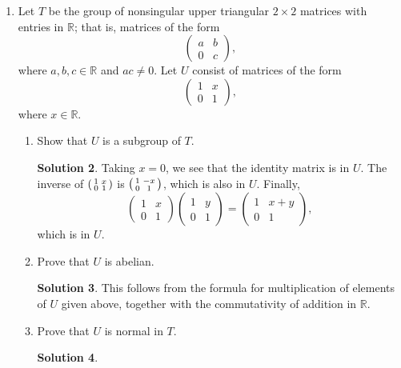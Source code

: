 \documentclass{article}
\newcommand{\RR}{\mathbb{R}}
\theoremstyle{definition}
\newtheorem*{solution}{Solution}
\begin{document}
\begin{enumerate}
\begin{solution}
\end{solution}
\item[10.4.] Let $T$ be the group of nonsingular upper triangular $2 \times 2$ matrices with entries in $\RR$; that is, matrices of the form
\[
\begin{pmatrix} a & b \\ 0 & c \end{pmatrix},
\]
where $a, b, c \in \RR$ and $ac \ne 0$. Let $U$ consist of matrices of the form
\[
\begin{pmatrix} 1 & x \\ 0 & 1 \end{pmatrix},
\]
where $x \in \RR$.
\begin{enumerate}
\item Show that $U$ is a subgroup of $T$.
\begin{solution}
Taking $x = 0$, we see that the identity matrix is in $U$.  The inverse of $\begin{psmallmatrix} 1 & x \\ 0 & 1 \end{psmallmatrix}$ is $\begin{psmallmatrix} 1 & -x \\ 0 & 1 \end{psmallmatrix}$, which is also in $U$.  Finally,
\[
\begin{pmatrix} 1 & x \\ 0 & 1 \end{pmatrix} \begin{pmatrix} 1 & y \\ 0 & 1 \end{pmatrix} = \begin{pmatrix} 1 & x+y \\ 0 & 1 \end{pmatrix},
\]
which is in $U$.
\end{solution}
\item Prove that $U$ is abelian.
\begin{solution}
This follows from the formula for multiplication of elements of $U$ given above, together with the commutativity of addition in $\RR$.
\end{solution}
\item Prove that $U$ is normal in $T$.
\begin{solution}
\begin{align*}

\end{align*}
\end{solution}
\end{enumerate}
\end{enumerate}
\end{document}
